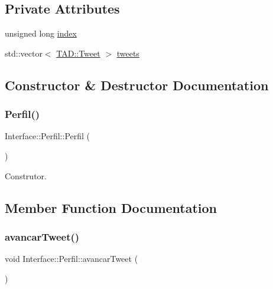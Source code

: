 \subsection*{Private Attributes}
\begin{DoxyCompactItemize}
\item 
unsigned long \hyperlink{class_interface_1_1_perfil_aa40e1a8f0f5ddf3b7ebeb5ebe9656e6e}{index}
\item 
std\+::vector$<$ \hyperlink{class_t_a_d_1_1_tweet}{T\+A\+D\+::\+Tweet} $>$ \hyperlink{class_interface_1_1_perfil_a8804eb352da38c2eaa101ca4a0a41f34}{tweets}
\end{DoxyCompactItemize}


\subsection{Constructor \& Destructor Documentation}
\mbox{\label{class_interface_1_1_perfil_a0292281cafc561ce75d94bcba59a9772}} 
\subsubsection{\texorpdfstring{Perfil()}{Perfil()}}
{\footnotesize\ttfamily Interface\+::\+Perfil\+::\+Perfil (\begin{DoxyParamCaption}{ }\end{DoxyParamCaption})}



Construtor. 



\subsection{Member Function Documentation}
\mbox{\label{class_interface_1_1_perfil_abbe830155fca2f3fd21d2c3c6d3bcb84}} 
\subsubsection{\texorpdfstring{avancar\+Tweet()}{avancarTweet()}}
{\footnotesize\ttfamily void Interface\+::\+Perfil\+::avancar\+Tweet (\begin{DoxyParamCaption}{ }\end{DoxyParamCaption})\hspace{0.3cm}{\ttfamily [private]}}



